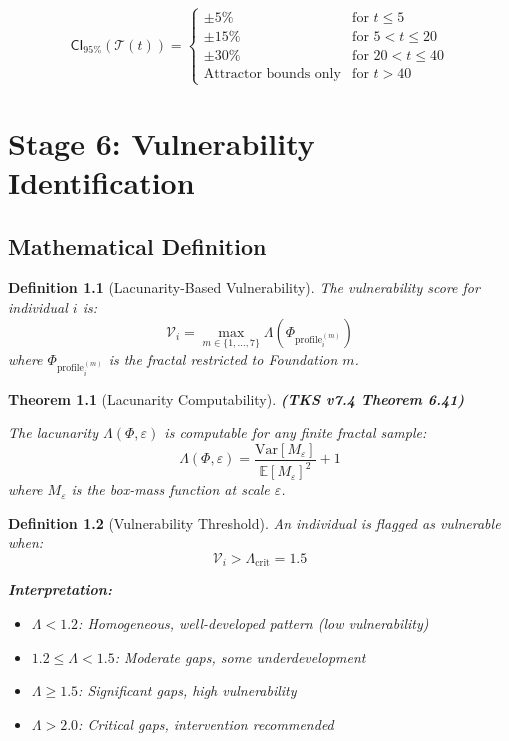\documentclass[11pt,twoside]{book}
\newcommand{\Frac}{\Phi}
\newcommand{\Lacunarity}{\Lambda}
\newcommand{\ProfileFrac}{\Phi_{\mathrm{profile}}}
\newcommand{\VulnScore}{\mathcal{V}}
\newcommand{\Timeline}{\mathcal{T}}
\newtheorem{definition}{Definition}[chapter]
\newtheorem{theorem}{Theorem}[chapter]
\begin{document}
\begin{equation}
\boxed{
    \mathsf{CI}_{95\%}(\Timeline(t)) =
    \begin{cases}
        \pm 5\% & \text{for } t \leq 5 \\
        \pm 15\% & \text{for } 5 < t \leq 20 \\
        \pm 30\% & \text{for } 20 < t \leq 40 \\
        \text{Attractor bounds only} & \text{for } t > 40
    \end{cases}
}
\end{equation}

\chapter{Stage 6: Vulnerability Identification}
\label{ch:stage6-vulnerability}

\section{Mathematical Definition}

\begin{definition}[Lacunarity-Based Vulnerability]
\label{def:lacunarity-vuln}
The \emph{vulnerability score} for individual $i$ is:
\[
    \VulnScore_i = \max_{m \in \{1,\ldots,7\}} \Lacunarity(\ProfileFrac_i^{(m)})
\]
where $\ProfileFrac_i^{(m)}$ is the fractal restricted to Foundation $m$.
\end{definition}

\begin{theorem}[Lacunarity Computability]
\label{thm:lacunarity-compute}
\textbf{(TKS v7.4 Theorem 6.41)}

The lacunarity $\Lacunarity(\Frac, \varepsilon)$ is computable for any finite fractal sample:
\[
    \Lacunarity(\Frac, \varepsilon) = \frac{\mathrm{Var}[M_\varepsilon]}{\mathbb{E}[M_\varepsilon]^2} + 1
\]
where $M_\varepsilon$ is the box-mass function at scale $\varepsilon$.
\end{theorem}

\begin{definition}[Vulnerability Threshold]
\label{def:vuln-threshold}
An individual is flagged as \emph{vulnerable} when:
\[
    \VulnScore_i > \Lacunarity_{\text{crit}} = 1.5
\]

\textbf{Interpretation:}
\begin{itemize}
    \item $\Lacunarity < 1.2$: Homogeneous, well-developed pattern (low vulnerability)
    \item $1.2 \leq \Lacunarity < 1.5$: Moderate gaps, some underdevelopment
    \item $\Lacunarity \geq 1.5$: Significant gaps, high vulnerability
    \item $\Lacunarity > 2.0$: Critical gaps, intervention recommended
\end{itemize}
\end{definition}
\end{document}
